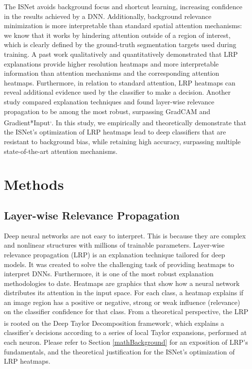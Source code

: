 \documentclass[fleqn,10pt]{wlscirep}
\begin{document}
{The ISNet avoids background focus and shortcut learning, increasing confidence in the results achieved by a DNN. Additionally, background relevance minimization is more interpretable than standard spatial attention mechanisms: we know that it works by hindering attention outside of a region of interest, which is clearly defined by the ground-truth segmentation targets used during training. A past work qualitatively and quantitatively demonstrated that LRP explanations provide higher resolution heatmaps and more interpretable information than attention mechanisms and the corresponding attention heatmaps\cite{LRPVsAttention}. Furthermore, in relation to standard attention, LRP heatmaps can reveal additional evidence used by the classifier to make a decision\cite{LRPVsAttention}. Another study compared explanation techniques and found layer-wise relevance propagation to be among the most robust, surpassing GradCAM and Gradient*Input\cite{LRPRobustness}\textsuperscript{,}\cite{LRPvsGrad}. In this study, we empirically and theoretically demonstrate that the ISNet's optimization of LRP heatmaps lead to deep classifiers that are resistant to background bias, while retaining high accuracy, surpassing multiple state-of-the-art attention mechanisms.

\section{Methods} 
\subsection{Layer-wise Relevance Propagation}
\label{LRP}
Deep neural networks are not easy to interpret. This is because they are complex and nonlinear structures with millions of trainable parameters. Layer-wise relevance propagation\cite{LRP} (LRP) is an explanation technique tailored for deep models. It was created to solve the challenging task of providing heatmaps to interpret DNNs. Furthermore, it is one of the most robust explanation methodologies to date\cite{LRPRobustness}. Heatmaps are graphics that show how a neural network distributes its attention in the input space. For each class, a heatmap explains if an image region has a positive or negative, strong or weak influence (relevance) on the classifier confidence for that class. From a theoretical perspective, the LRP is rooted on the Deep Taylor Decomposition framework\cite{LRPBook}\textsuperscript{,}\cite{LRPZb}, which explains a classifier's decisions according to a series of local Taylor expansions, performed at each neuron. Please refer to Section \ref{mathBackground} for an exposition of LRP's fundamentals, and the theoretical justification for the ISNet's optimization of LRP heatmaps.

}
\end{document}
